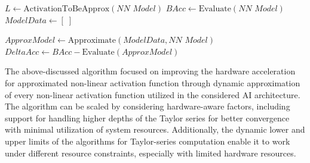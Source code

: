 \documentclass[conference,10pt]{IEEEtran}
\begin{document}
    \begin{algorithm}[h]
        \caption{General Purpose Non-linear Approximation Algorithm}
        \label{alg:approximator}
        
        $L \gets \text{ActivationToBeApprox}(\textit{NN Model})$\;
        $BAcc \gets \text{Evaluate}(\textit{NN Model})$\;
        $ModelData \gets [\;]$\;
        
        
        $ApproxModel \gets \text{Approximate}(\textit{ModelData}, \textit{NN Model})$\;
        $DeltaAcc \gets BAcc - \text{Evaluate}(\textit{ApproxModel})$\;
        
        
        \;
    
    \end{algorithm}

    The above-discussed algorithm focused on improving the hardware acceleration for approximated non-linear activation function through dynamic approximation of every non-linear activation function utilized in the considered AI architecture. The algorithm can be scaled by considering hardware-aware factors, including support for handling higher depths of the Taylor series for better convergence with minimal utilization of system resources. Additionally, the dynamic lower and upper limits of the algorithms for Taylor-series computation enable it to work under different resource constraints, especially with limited hardware resources. 
\end{document}

